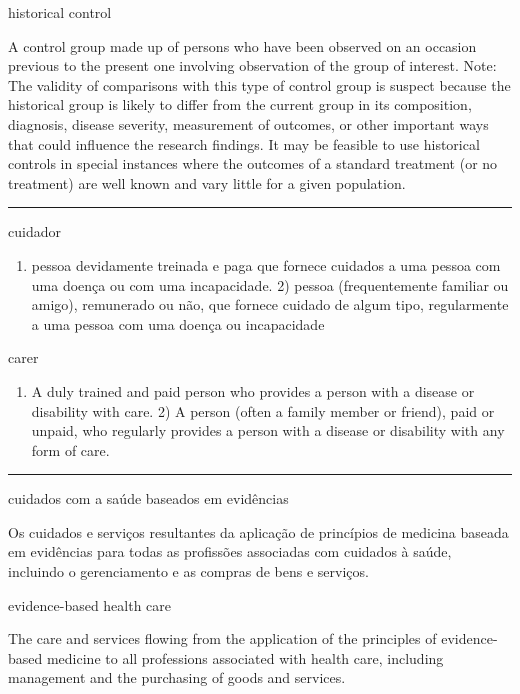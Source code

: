 \documentclass[
  openany]{book}
\providecommand{\tightlist}{%
  \setlength{\itemsep}{0pt}\setlength{\parskip}{0pt}}
\begin{document}
historical control

A control group made up of persons who have been observed on an occasion previous to the present one involving observation of the group of interest. Note: The validity of comparisons with this type of control group is suspect because the historical group is likely to differ from the current group in its composition, diagnosis, disease severity, measurement of outcomes, or other important ways that could influence the research findings. It may be feasible to use historical controls in special instances where the outcomes of a standard treatment (or no treatment) are well known and vary little for a given population.

\begin{center}\rule{0.5\linewidth}{0.5pt}\end{center}

cuidador

\begin{enumerate}
\def\labelenumi{\arabic{enumi})}
\tightlist
\item
  pessoa devidamente treinada e paga que fornece cuidados a uma pessoa com uma doença ou com uma incapacidade. 2) pessoa (frequentemente familiar ou amigo), remunerado ou não, que fornece cuidado de algum tipo, regularmente a uma pessoa com uma doença ou incapacidade
\end{enumerate}

carer

\begin{enumerate}
\def\labelenumi{\arabic{enumi})}
\tightlist
\item
  A duly trained and paid person who provides a person with a disease or disability with care. 2) A person (often a family member or friend), paid or unpaid, who regularly provides a person with a disease or disability with any form of care.
\end{enumerate}

\begin{center}\rule{0.5\linewidth}{0.5pt}\end{center}

cuidados com a saúde baseados em evidências

Os cuidados e serviços resultantes da aplicação de princípios de medicina baseada em evidências para todas as profissões associadas com cuidados à saúde, incluindo o gerenciamento e as compras de bens e serviços.

evidence-based health care

The care and services flowing from the application of the principles of evidence-based medicine to all professions associated with health care, including management and the purchasing of goods and services.
\end{document}
